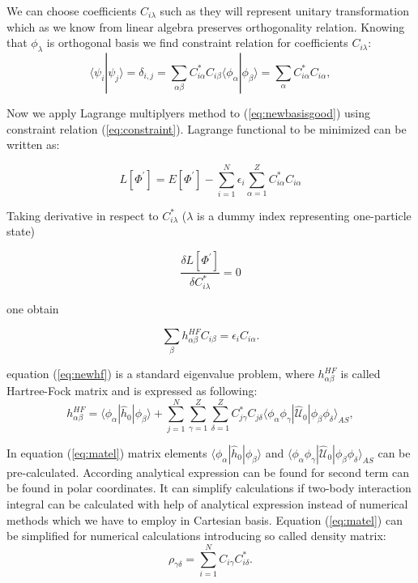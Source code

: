 \documentclass[10pt]{article}
\newcommand*{\hatU}{\hat{\mathcal{U}}}
\begin{document}
We can choose coefficients $C_{i \lambda}$ such as they will represent unitary transformation which as we know from linear algebra preserves orthogonality relation. Knowing that $\phi_{\lambda}$ is orthogonal basis we find constraint relation for coefficients $C_{i \lambda}$:
\begin{equation}
\langle \psi_i | \psi_j \rangle=\delta_{i,j}=\sum_{\alpha\beta} C^*_{i\alpha}C_{i\beta}\langle \phi_\alpha | \phi_\beta \rangle = \sum_{\alpha} C^*_{i\alpha}C_{i\alpha},
\label{eq:constraint}
\end{equation}

Now we apply Lagrange multiplyers method to (\ref{eq:newbasisgood}) using constraint relation (\ref{eq:constraint}). Lagrange functional to be minimized can be written as:

\begin{equation}
L[\Phi^{\prime}] = E[\Phi^{\prime}] - \sum_{i=1}^N\epsilon_i\sum_{\alpha=1}^Z C^*_{i\alpha}C_{i\alpha}
\end{equation}

Taking derivative in respect to $C^*_{i\lambda}$ ($\lambda$ is a dummy index representing one-particle state)

\begin{equation}
\frac {\delta L[\Phi^{\prime}]}{\delta C^*_{i\lambda}} = 0
\end{equation}

one obtain 

\begin{equation}
\sum_{\beta}h_{\alpha\beta}^{HF}C_{i\beta}=\epsilon_iC_{i\alpha}. \label{eq:newhf}
\end{equation}

equation (\ref{eq:newhf}) is a standard eigenvalue problem, where $h_{\alpha\beta}^{HF}$ is called Hartree-Fock matrix and is expressed as following:
\begin{equation}\label{eq:matel}
h_{\alpha\beta}^{HF}=\langle \phi_{\alpha} | \hat{h}_0 | \phi_{\beta} \rangle+
\sum_{j=1}^N\sum_{\gamma=1}^Z\sum_{\delta=1}^Z C^*_{j\gamma}C_{j\delta}\langle \phi_{\alpha}\phi_{\gamma}|\hatU_{0}|\phi_{\beta}\phi_{\delta}\rangle_{AS},
\end{equation}

In equation (\ref{eq:matel}) matrix elements $\langle \phi_{\alpha} | \hat{h}_0 | \phi_{\beta} \rangle$ and $\langle \phi_{\alpha}\phi_{\gamma}|\hatU_{0}|\phi_{\beta}\phi_{\delta}\rangle_{AS}$ can be pre-calculated. According \cite{Anisimovas} analytical expression can be found for second term can be found in polar coordinates. It can simplify calculations if two-body interaction integral can be calculated with help of analytical expression instead of numerical methods which we have to employ in Cartesian basis. 
Equation (\ref{eq:matel}) can be simplified for numerical calculations introducing so called density matrix:
\begin{equation}
\rho_{\gamma\delta} = \sum_{i=1}^{N}C_{i\gamma}C^*_{i\delta}.
\label{_auto10}
\end{equation}
\end{document}
